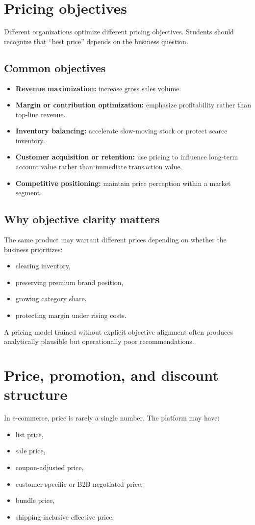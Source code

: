 \section{Pricing objectives}
Different organizations optimize different pricing objectives.
Students should recognize that ``best price'' depends on the business question.

\subsection{Common objectives}
\begin{itemize}
  \item \textbf{Revenue maximization:} increase gross sales volume.
  \item \textbf{Margin or contribution optimization:} emphasize profitability rather than top-line revenue.
  \item \textbf{Inventory balancing:} accelerate slow-moving stock or protect scarce inventory.
  \item \textbf{Customer acquisition or retention:} use pricing to influence long-term account value rather than immediate transaction value.
  \item \textbf{Competitive positioning:} maintain price perception within a market segment.
\end{itemize}

\subsection{Why objective clarity matters}
The same product may warrant different prices depending on whether the business prioritizes:
\begin{itemize}
  \item clearing inventory,
  \item preserving premium brand position,
  \item growing category share,
  \item protecting margin under rising costs.
\end{itemize}

A pricing model trained without explicit objective alignment often produces analytically plausible but operationally poor recommendations.

\section{Price, promotion, and discount structure}
In e-commerce, price is rarely a single number.
The platform may have:
\begin{itemize}
  \item list price,
  \item sale price,
  \item coupon-adjusted price,
  \item customer-specific or B2B negotiated price,
  \item bundle price,
  \item shipping-inclusive effective price.
\end{itemize}

